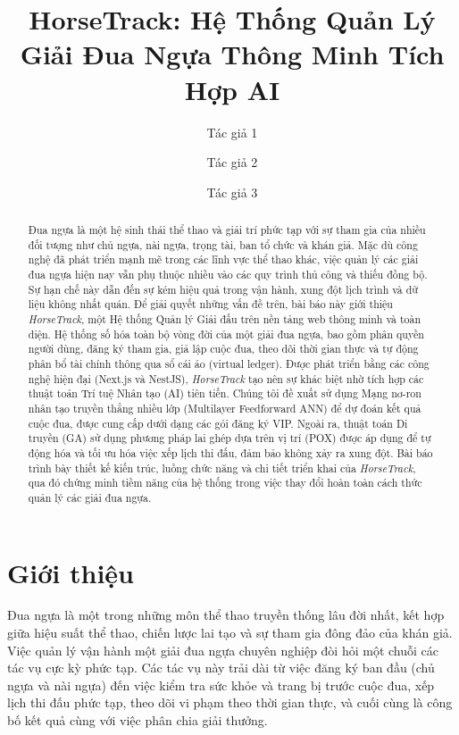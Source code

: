\documentclass{llncs}
\begin{document}
%
\title{HorseTrack: Hệ Thống Quản Lý Giải Đua Ngựa Thông Minh Tích Hợp AI}
%
%
\author{Tác giả 1 \and
Tác giả 2 \and
Tác giả 3}
%
%
%
\maketitle              
%
\begin{abstract}
Đua ngựa là một hệ sinh thái thể thao và giải trí phức tạp với sự tham gia của nhiều đối tượng như chủ ngựa, nài ngựa, trọng tài, ban tổ chức và khán giả. Mặc dù công nghệ đã phát triển mạnh mẽ trong các lĩnh vực thể thao khác, việc quản lý các giải đua ngựa hiện nay vẫn phụ thuộc nhiều vào các quy trình thủ công và thiếu đồng bộ. Sự hạn chế này dẫn đến sự kém hiệu quả trong vận hành, xung đột lịch trình và dữ liệu không nhất quán. Để giải quyết những vấn đề trên, bài báo này giới thiệu \textit{HorseTrack}, một Hệ thống Quản lý Giải đấu trên nền tảng web thông minh và toàn diện. Hệ thống số hóa toàn bộ vòng đời của một giải đua ngựa, bao gồm phân quyền người dùng, đăng ký tham gia, giả lập cuộc đua, theo dõi thời gian thực và tự động phân bổ tài chính thông qua sổ cái ảo (virtual ledger). Được phát triển bằng các công nghệ hiện đại (Next.js và NestJS), \textit{HorseTrack} tạo nên sự khác biệt nhờ tích hợp các thuật toán Trí tuệ Nhân tạo (AI) tiên tiến. Chúng tôi đề xuất sử dụng Mạng nơ-ron nhân tạo truyền thẳng nhiều lớp (Multilayer Feedforward ANN) để dự đoán kết quả cuộc đua, được cung cấp dưới dạng các gói đăng ký VIP. Ngoài ra, thuật toán Di truyền (GA) sử dụng phương pháp lai ghép dựa trên vị trí (POX) được áp dụng để tự động hóa và tối ưu hóa việc xếp lịch thi đấu, đảm bảo không xảy ra xung đột. Bài báo trình bày thiết kế kiến trúc, luồng chức năng và chi tiết triển khai của \textit{HorseTrack}, qua đó chứng minh tiềm năng của hệ thống trong việc thay đổi hoàn toàn cách thức quản lý các giải đua ngựa.

\end{abstract}
%
%
%
\section{Giới thiệu}
Đua ngựa là một trong những môn thể thao truyền thống lâu đời nhất, kết hợp giữa hiệu suất thể thao, chiến lược lai tạo và sự tham gia đông đảo của khán giả. Việc quản lý vận hành một giải đua ngựa chuyên nghiệp đòi hỏi một chuỗi các tác vụ cực kỳ phức tạp. Các tác vụ này trải dài từ việc đăng ký ban đầu (chủ ngựa và nài ngựa) đến việc kiểm tra sức khỏe và trang bị trước cuộc đua, xếp lịch thi đấu phức tạp, theo dõi vi phạm theo thời gian thực, và cuối cùng là công bố kết quả cùng với việc phân chia giải thưởng.
\end{document}
